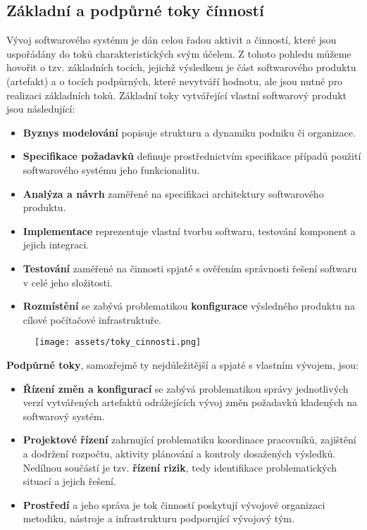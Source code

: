 \subsection{Základní a podpůrné toky čínností}
Vývoj softwarového systému je dán celou řadou aktivit a činností, které jsou uspořádány do toků charakteristických svým účelem.  Z tohoto pohledu můžeme hovořit o tzv. základních tocích, jejichž výsledkem je část softwarového produktu (artefakt) a o tocích podpůrných, které nevytváří hodnotu, ale jsou nutné pro realizaci základních toků.
Základní toky vytvářející vlastní softwarový produkt jsou následující:
\begin{itemize}
    \item \textbf{Byznys modelování} popisuje strukturu a dynamiku podniku či organizace.
    \item \textbf{Specifikace požadavků} definuje prostřednictvím specifikace případů použití softwarového systému jeho funkcionalitu.
    \item \textbf{Analýza a návrh} zaměřené na specifikaci architektury softwarového produktu.
    \item \textbf{Implementace} reprezentuje vlastní tvorbu softwaru, testování komponent a jejich integraci.
    \item \textbf{Testování} zaměřené na činnosti spjaté s ověřením správnosti řešení softwaru v celé jeho složitosti.
    \item \textbf{Rozmístění} se zabývá problematikou \textbf{konfigurace} výsledného produktu na cílové počítačové infrastruktuře.
\end{itemize}

\begin{figure}[H]
    \centering
    \texttt{[image: assets/toky\_cinnosti.png]}
\end{figure}

\noindent\textbf{Podpůrné toky}, samozřejmě ty nejdůležitější a spjaté s vlastním vývojem, jsou:
\begin{itemize}
    \item \textbf{Řízení změn a konfigurací} se zabývá problematikou správy jednotlivých verzí vytvářených artefaktů odrážejících vývoj změn požadavků kladených na softwarový systém.
    \item \textbf{Projektové řízení} zahrnující problematiku koordinace pracovníků, zajištění a dodržení rozpočtu, aktivity plánování a kontroly dosažených výsledků.  Nedílnou součástí je tzv. \textbf{řízení rizik}, tedy identifikace problematických situací a jejich řešení.
    \item \textbf{Prostředí} a jeho správa je tok činností poskytují vývojové organizaci metodiku, nástroje a infrastrukturu podporující vývojový tým.
\end{itemize}

